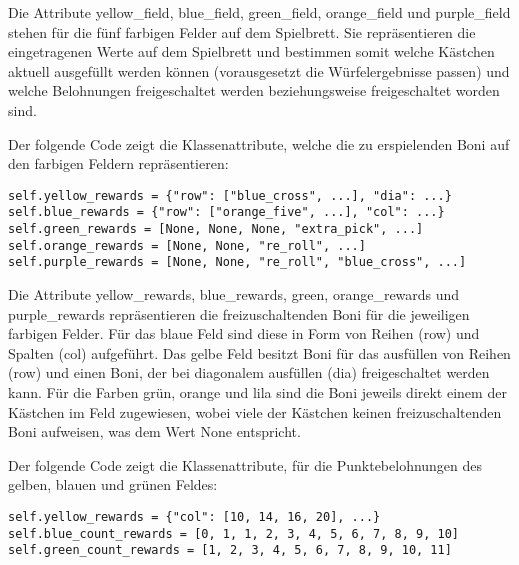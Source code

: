 Die Attribute yellow\_field, blue\_field, green\_field, orange\_field und purple\_field stehen für die fünf farbigen Felder auf dem Spielbrett. Sie repräsentieren die eingetragenen Werte auf dem Spielbrett und bestimmen somit welche Kästchen aktuell ausgefüllt werden können (vorausgesetzt die Würfelergebnisse passen) und welche Belohnungen freigeschaltet werden beziehungsweise freigeschaltet worden sind.\\

\begin{minipage}{\linewidth}
Der folgende Code zeigt die Klassenattribute, welche die zu erspielenden Boni auf den farbigen Feldern repräsentieren:
\vspace{0.5cm}
\begin{lstlisting}[caption={Klassenattribute für freizuschaltende Boni}]
self.yellow_rewards = {"row": ["blue_cross", ...], "dia": ...}
self.blue_rewards = {"row": ["orange_five", ...], "col": ...}
self.green_rewards = [None, None, None, "extra_pick", ...]
self.orange_rewards = [None, None, "re_roll", ...]
self.purple_rewards = [None, None, "re_roll", "blue_cross", ...]
\end{lstlisting}
\end{minipage}

Die Attribute yellow\_rewards, blue\_rewards, green, orange\_rewards und purple\_rewards repräsentieren die freizuschaltenden Boni für die jeweiligen farbigen Felder. Für das blaue Feld sind diese in Form von Reihen (row) und Spalten (col) aufgeführt. Das gelbe Feld besitzt Boni für das ausfüllen von Reihen (row) und einen Boni, der bei diagonalem ausfüllen (dia) freigeschaltet werden kann. Für die Farben grün, orange und lila sind die Boni jeweils direkt einem der Kästchen im Feld zugewiesen, wobei viele der Kästchen keinen freizuschaltenden Boni aufweisen, was dem Wert None entspricht.\\

\begin{minipage}{\linewidth}
Der folgende Code zeigt die Klassenattribute, für die Punktebelohnungen des gelben, blauen und grünen Feldes:
\vspace{0.5cm}
\begin{lstlisting}[caption={Klassenattribute für Punktestand}]
self.yellow_rewards = {"col": [10, 14, 16, 20], ...}
self.blue_count_rewards = [0, 1, 1, 2, 3, 4, 5, 6, 7, 8, 9, 10]
self.green_count_rewards = [1, 2, 3, 4, 5, 6, 7, 8, 9, 10, 11]
\end{lstlisting}
\end{minipage}

